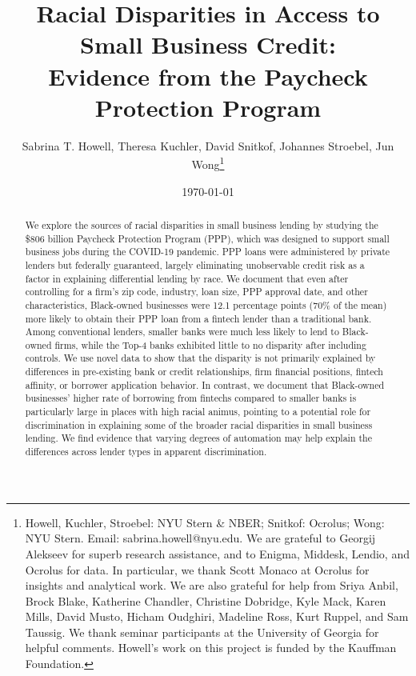\documentclass[11pt]{article}
\title{\Large \textbf{Racial Disparities in Access to Small Business Credit:\\Evidence from the Paycheck Protection Program}}
\author{Sabrina T. Howell, Theresa Kuchler, David Snitkof, Johannes Stroebel, Jun Wong\thanks{Howell, Kuchler, Stroebel: NYU Stern \& NBER; Snitkof: Ocrolus; Wong: NYU Stern. Email: sabrina.howell@nyu.edu. We are grateful to Georgij Alekseev for superb research assistance, and to Enigma, Middesk, Lendio, and Ocrolus for data. In particular, we thank Scott Monaco at Ocrolus for insights and analytical work. We are also grateful for help from Sriya Anbil, Brock Blake, Katherine Chandler, Christine Dobridge, Kyle Mack, Karen Mills, David Musto, Hicham Oudghiri, Madeline Ross, Kurt Ruppel, and Sam Taussig. We thank seminar participants at the University of Georgia for helpful comments. Howell's work on this project is funded by the Kauffman Foundation. } }
\date{\today}
\begin{document}

\begin{titlepage}

\maketitle
\thispagestyle{empty}

\begin{abstract}
\begin{singlespace}

\noindent We explore the sources of racial disparities in small business lending by studying the \$806 billion Paycheck Protection Program (PPP), which was designed to support small business jobs during the COVID-19 pandemic. PPP loans were administered by private lenders but federally guaranteed, largely eliminating unobservable credit risk as a factor in explaining differential lending by race. We document that even after controlling for a firm's zip code, industry, loan size, PPP approval date, and other characteristics, Black-owned businesses were 12.1 percentage points (70\% of the mean) more likely to obtain their PPP loan from a fintech lender than a traditional bank. Among conventional lenders, smaller banks were much less likely to lend to Black-owned firms, while the Top-4 banks exhibited little to no disparity after including controls. We use novel data to show that the disparity is not primarily explained by differences in pre-existing bank or credit relationships, firm financial positions, fintech affinity, or borrower application behavior. In contrast, we document that Black-owned businesses' higher rate of borrowing from fintechs compared to smaller banks is particularly large in places with high racial animus, pointing to a potential role for discrimination in explaining some of the broader racial disparities in small business lending. We find evidence that varying degrees of automation may help explain the differences across lender types in apparent discrimination.
\end{singlespace}
\end{abstract}
\bigskip \bigskip

\end{titlepage}

\onehalfspacing

\end{document}
